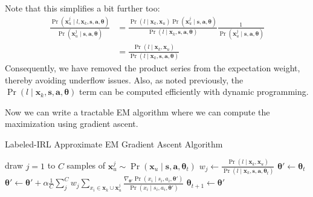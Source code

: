 {Note that this simplifies a bit further too:
\begin{align*}
\frac{\Pr(\bm{x}_u^j \mid l, \bm{x}_k, \bm{s}, \bm{a}, \bm{\theta})}{\Pr(\bm{x}_u^j \mid \bm{s}, \bm{a}, \bm{\theta})} &= \frac{\Pr(l \mid \bm{x}_k, \bm{x}_u) \Pr(\bm{x}_u^j \mid \bm{s}, \bm{a}, \bm{\theta}) }{\Pr(l \mid \bm{x}_k, \bm{s}, \bm{a}, \bm{\theta})} \frac{1}{\Pr(\bm{x}_u^j \mid \bm{s}, \bm{a}, \bm{\theta})} \\
&= \frac{\Pr(l \mid \bm{x}_k, \bm{x}_u)}{\Pr(l \mid \bm{x}_k, \bm{s}, \bm{a}, \bm{\theta})}
\end{align*}
Consequently, we have removed the product series from the expectation weight, thereby avoiding underflow issues. Also, as noted previously, the $\Pr(l \mid \bm{x}_k, \bm{s}, \bm{a}, \bm{\theta})$ term can be computed efficiently with dynamic programming.

Now we can write a tractable EM algorithm where we can compute the maximization using gradient ascent.

\begin{algorithm}
\caption{Labeled-IRL Approximate EM Gradient Ascent Algorithm}
\begin{algorithmic}
\State draw $j =1$ to $C$ samples of $\bm{x}_u^j \sim \Pr(\bm{x}_u \mid \bm{s}, \bm{a}, \bm{\theta}_t)$ 
\State $w_j \gets \frac{\Pr(l \mid \bm{x}_k, \bm{x}_u)}{\Pr(l \mid \bm{x}_k, \bm{s}, \bm{a}, \bm{\theta}_t)}$ 
\EndFor
\State $\bm{\theta}' \gets \bm{\theta}_t$
 
\State $\bm{\theta}' \gets \bm{\theta}' + \alpha \frac{1}{C} \sum_j^C w_j \sum_{x_i \in \bm{x}_k \cup \bm{x}_u^j} \frac{\nabla_{\bm{\theta}'} \Pr(x_i \mid s_i, a_i, \bm{\theta}')}{\Pr(x_i \mid s_i, a_i, \bm{\theta}')} $
\EndFor
\State $\bm{\theta}_{t+1} \gets \bm{\theta}'$
\EndFor
\end{algorithmic}
\end{algorithm}
}
